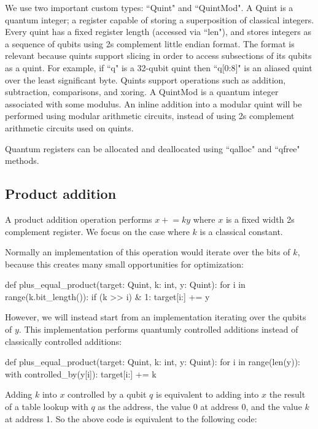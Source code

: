 \documentclass[onecolumn,unpublished]{quantumarticle}
\theoremstyle{definition}
\theoremstyle{definition}
\theoremstyle{definition}
\newcommand{\pluseq}{\mathrel{+}=}
\begin{document}
We use two important custom types: ``Quint" and ``QuintMod".
A Quint is a quantum integer; a register capable of storing a superposition of classical integers.
Every quint has a fixed register length (accessed via ``len"), and stores integers as a sequence of qubits using 2s complement little endian format.
The format is relevant because quints support slicing in order to access subsections of its qubits as a quint.
For example, if ``q" is a 32-qubit quint then ``q[0:8]" is an aliased quint over the least significant byte.
Quints support operations such as addition, subtraction, comparisons, and xoring.
A QuintMod is a quantum integer associated with some modulus.
An inline addition into a modular quint will be performed using modular arithmetic circuits, instead of using 2s complement arithmetic circuits used on quints.

Quantum registers can be allocated and deallocated using ``qalloc" and ``qfree" methods.


\subsection{Product addition}

A product addition operation performs $x \pluseq ky$ where $x$ is a fixed width 2s complement register.
We focus on the case where $k$ is a classical constant.

Normally an implementation of this operation would iterate over the bits of $k$, because this creates many small opportunities for optimization:

\begin{python}
    def plus_equal_product(target: Quint, k: int, y: Quint):
        for i in range(k.bit_length()):
            if (k >> i) & 1:
                target[i:] += y
\end{python}

However, we will instead start from an implementation iterating over the qubits of $y$.
This implementation performs quantumly controlled additions instead of classically controlled additions:

\begin{python}
    def plus_equal_product(target: Quint, k: int, y: Quint):
        for i in range(len(y)):
            with controlled_by(y[i]):
                target[i:] += k
\end{python}

Adding $k$ into $x$ controlled by a qubit $q$ is equivalent to adding into $x$ the result of a table lookup with $q$ as the address, the value $0$ at address 0, and the value $k$ at address 1.
So the above code is equivalent to the following code:
\end{document}
